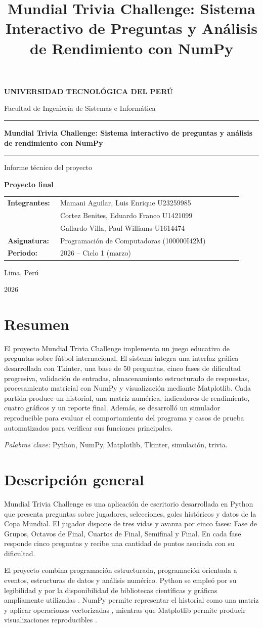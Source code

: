 \documentclass[stu,12pt,a4paper,biblatex,floatsintext]{apa7}
\title{Mundial Trivia Challenge: Sistema Interactivo de Preguntas y Análisis de Rendimiento con NumPy}
\makeatletter
\renewcommand{\maketitle}{%
  \begin{titlepage}
    \thispagestyle{empty}
    \centering

    \vspace*{1.1cm}
    {\fontsize{15}{18}\selectfont\bfseries UNIVERSIDAD TECNOLÓGICA DEL PERÚ\par}
    \vspace{0.35cm}
    {\fontsize{11.5}{14}\selectfont\color{utpGris}Facultad de Ingeniería de Sistemas e Informática\par}

    \vspace{2.25cm}
    {\color{utpAzul}\rule{0.15\textwidth}{1.1pt}\par}
    \vspace{0.65cm}
    {\parbox{0.88\textwidth}{\centering\fontsize{21}{27}\selectfont\bfseries\color{utpAzul}
      Mundial Trivia Challenge: Sistema interactivo de preguntas y análisis de rendimiento con NumPy\par}}
    \vspace{0.65cm}
    {\color{utpAzul}\rule{0.15\textwidth}{1.1pt}\par}
    \vspace{0.75cm}
    {\fontsize{12}{15}\selectfont\color{utpGris}Informe técnico del proyecto\par}
    \vspace{0.2cm}
    {\fontsize{10.5}{13}\selectfont\bfseries Proyecto final\par}

    \vfill
    \begin{minipage}{0.82\textwidth}
      \small
      \renewcommand{\arraystretch}{1.35}
      \begin{tabular}{@{}>{\bfseries}p{0.21\linewidth}p{0.73\linewidth}@{}}
        Integrantes: & Mamani Aguilar, Luis Enrique \hfill U23259985 \\
                     & Cortez Benites, Eduardo Franco \hfill U1421099 \\
                     & Gallardo Villa, Paul Williams \hfill U1614474 \\
        Asignatura:  & Programación de Computadoras (100000I42M) \\
        Periodo:     & 2026 -- Ciclo 1 (marzo) \\
      \end{tabular}
    \end{minipage}

    \vfill
    {\fontsize{11}{14}\selectfont Lima, Perú\par}
    \vspace{0.18cm}
    {\fontsize{10.5}{13}\selectfont\color{utpGrisClaro}2026\par}
    \vspace*{0.8cm}
  \end{titlepage}
}
\newcommand{\indiceinforme}{%
  \pagenumbering{roman}
  \setcounter{page}{1}
  \begingroup
    \singlespacing
    \tableofcontents
  \endgroup
  \clearpage
  \pagenumbering{arabic}
  \setcounter{page}{1}
}
\makeatother
\begin{document}
\hypersetup{pageanchor=false}
\maketitle
\hypersetup{pageanchor=true}
\indiceinforme

\section*{Resumen}
{}

El proyecto Mundial Trivia Challenge implementa un juego educativo de preguntas sobre fútbol internacional. El sistema integra una interfaz gráfica desarrollada con Tkinter, una base de 50 preguntas, cinco fases de dificultad progresiva, validación de entradas, almacenamiento estructurado de respuestas, procesamiento matricial con NumPy y visualización mediante Matplotlib. Cada partida produce un historial, una matriz numérica, indicadores de rendimiento, cuatro gráficos y un reporte final. Además, se desarrolló un simulador reproducible para evaluar el comportamiento del programa y casos de prueba automatizados para verificar sus funciones principales.

\noindent\textit{Palabras clave:} Python, NumPy, Matplotlib, Tkinter, simulación, trivia.

\clearpage

\section{Descripción general}

Mundial Trivia Challenge es una aplicación de escritorio desarrollada en Python que presenta preguntas sobre jugadores, selecciones, goles históricos y datos de la Copa Mundial. El jugador dispone de tres vidas y avanza por cinco fases: Fase de Grupos, Octavos de Final, Cuartos de Final, Semifinal y Final. En cada fase responde cinco preguntas y recibe una cantidad de puntos asociada con su dificultad.

El proyecto combina programación estructurada, programación orientada a eventos, estructuras de datos y análisis numérico. Python se empleó por su legibilidad y por la disponibilidad de bibliotecas científicas y gráficas ampliamente utilizadas \parencite{python2026}. NumPy permite representar el historial como una matriz y aplicar operaciones vectorizadas \parencite{harris2020array}, mientras que Matplotlib permite producir visualizaciones reproducibles \parencite{hunter2007matplotlib}.
\end{document}
